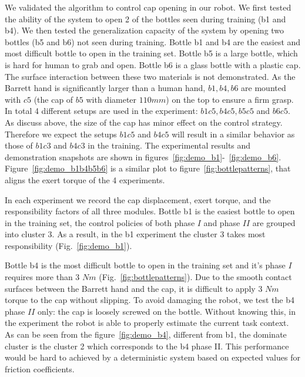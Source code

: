 We validated the algorithm to control cap opening in our robot. We first tested the ability of the system to open 2 of the bottles seen during training (b1 and b4). We then tested the generalization capacity of the system by opening two bottles (b5 and b6) not seen during training.
Bottle b1 and b4 are the easiest and most difficult bottle to open in the training set.
Bottle b5 is a large bottle, which is hard for human to grab and open. Bottle b6 is a glass bottle with a plastic cap. The surface interaction between these two materials is not demonstrated. As the Barrett hand is significantly larger than a human hand, $b1, b4, b6$ are mounted with $c5$ (the cap of $b5$ with diameter $110 mm$) on the top to ensure a firm grasp. In total 4 different setups are used in the experiment: $b1c5, b4c5, b5c5$ and $b6c5$. As discuss above, the size of the cap has minor effect on the control strategy. Therefore we expect the setups $b1c5$ and $b4c5$ will result in a similar behavior as those of $b1c3$ and $b4c3$ in the training. The experimental results and demonstration snapshots are shown in figures~\ref{fig:demo_b1}-~\ref{fig:demo_b6}. Figure~\ref{fig:demo_b1b4b5b6} is a similar plot to figure~\ref{fig:bottlepatterns}, that aligns the exert torque of the 4 experiments.

In each experiment we record the cap displacement, exert torque, and the responsibility factors of all three modules. Bottle b1 is the easiest bottle to open in the training set, the control policies of both phase $I$ and phase $II$ are grouped into cluster 3. As a result, in the b1 experiment the cluster 3 takes most responsibility (Fig.~\ref{fig:demo_b1}).

Bottle b4 is the most difficult bottle to open in the training set and it's phase $I$ requires more than 3 $Nm$ (Fig.~\ref{fig:bottlepatterns}). Due to the smooth contact surfaces between the Barrett hand and the cap, it is difficult to apply 3 $Nm$ torque to the cap without slipping. To avoid damaging the robot, we test the b4 phase $II$ only: the cap is loosely screwed on the bottle. Without knowing this, in the experiment the robot is able to properly estimate the current task context. As can be seen from the figure~\ref{fig:demo_b4}, different from b1, the dominate cluster is the cluster 2 which corresponds to the b4 phase II. This performance would be hard to achieved by a deterministic system based on expected values for friction coefficients.

